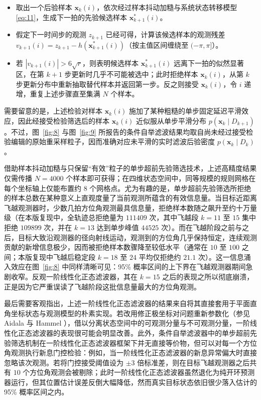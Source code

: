 \begin{itemize}
\item 取出一个后验样本 $\bm{x}_k(i)$，依次经过样本抖动加糙与系统状态转移模型 \eqref{eq:11}，生成下一拍的先验候选样本 $\bm{x}_{k+1}^*(i)$。
\item 假定下一时间步的观测 $z_{k+1}$ 已经可得，计算该候选样本的观测残差 $v_{k+1}(i) = z_{k+1} - h(\bm{x}_{k+1}^*(i))$（按主值区间缠绕至 $(-\pi, \pi]$）。
\item 若 $|v_{k+1}(i)| > 6\sqrt{r}$，则表明候选样本 $\bm{x}_{k+1}^*(i)$ 远离下一拍的似然显著区，在第 $k + 1$ 步更新时几乎不可能被选中；此时拒绝样本 $\bm{x}_k(i)$，从第 $k$ 步更新分布中重新抽取替代样本并返回第一步。反之则接受 $\bm{x}_k(i)$，令 $i$ 递增，重复上述步骤直至集满 $N$ 个样本。
\end{itemize}

需要留意的是，上述检验对样本 $\bm{x}_k(i)$ 施加了某种粗糙的单步固定延迟平滑效应，因此经接受检验筛选后的样本 $\bm{x}_k(i)$ 近似服从单步平滑分布 $p(\bm{x}_k \mid D_{k+1})$。不过，图~\ref{fig:8} 与图~\ref{fig:9} 所报告的条件自举滤波结果均取自尚未经过接受检验编辑的原始重采样粒子，因而准确对应未平滑的实时滤波后验密度 $p(\bm{x}_k \mid D_k)$。

借助样本抖动加糙与只保留“有效”粒子的单步超前先验筛选技术，上述高精度结果仅需传播 $N = 4000$ 个样本即可获得；在四维状态空间中，同等规模的规则网格在每个坐标轴上仅能布置约 $8$ 个网格点。尤为有趣的是，单步超前先验筛选所拒绝的样本总数在某种意义上直观度量了当前观测所蕴含的有效信息量。当目标近距离飞越观测器时，少数几拍方位角观测最具信息量，拒绝样本数随之飙升至约十万量级（在本版复现中，全轨迹总拒绝量为 $111409$ 次，其中飞越段 $k = 11$ 至 $15$ 集中拒绝 $109899$ 次，并在 $k = 13$ 达到单步峰值 $44525$ 次）。而在飞越阶段之前与之后，目标大致沿观测器的径向射线运动，观测到的方位角几乎保持恒定，连续观测贡献的新增信息极少，因而被拒绝样本数骤降至较低水平（通常在 $10$ 至 $100$ 之间；本版复现中飞越后稳定段 $k = 18$ 至 $24$ 平均仅拒绝约 $21.1$ 次）。这一信息涌入效应在图~\ref{fig:8} 中同样清晰可见：95\% 概率区间的上下界在飞越观测器期间急剧收窄。反观一阶线性化正态滤波器，其在 $k = 15$ 之后的表现之所以彻底崩溃，正是因为它严重误读了飞越阶段这批信息量最大的方位角观测。

最后需要客观指出，上述一阶线性化正态滤波器的结果来自将其直接套用于平面直角坐标状态与观测模型的朴素实现。若改用修正极坐标对问题重新参数化（参见 Aidala 与 Hammel \cite{r17}），借以分离状态空间中的可观测分量与不可观测分量，一阶线性化正态滤波器的表现很可能会明显改善。此外，条件自举滤波器中的单步超前先验筛选机制在一阶线性化正态滤波器框架下并无直接等价物，但可以对每一个方位角观测执行新息门控检验：例如，当一阶线性化正态滤波器的新息异常偏大时直接忽略该次观测。若将门控接受阈值设为 $\pm 3$ 倍标准差，则在目标飞越观测器之后共有 $10$ 个方位角观测会被剔除；此时一阶线性化正态滤波器虽然退化为纯开环预测器运行，但其位置估计误差反倒大幅降低，然而真实目标状态依旧很少落入估计的 95\% 概率区间之内。
